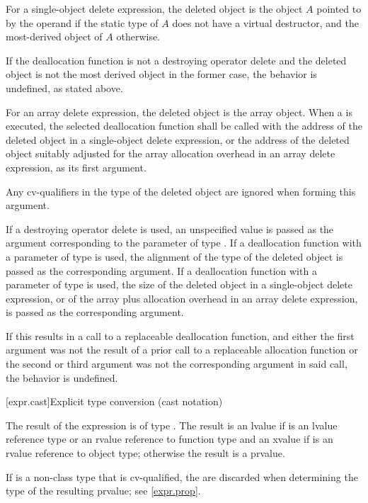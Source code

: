 \pnum
For a single-object delete expression,
the deleted object is
the object $A$ pointed to by the operand
if the static type of $A$ does not have a virtual destructor,
and the most-derived object of $A$ otherwise.
\begin{note}
If the deallocation function is not a destroying operator delete
and the deleted object is not the most derived object in the former case,
the behavior is undefined,
as stated above.
\end{note}
For an array delete expression,
the deleted object is
the array object.
When a 
is executed, the selected deallocation function shall be called with
the address of the deleted object
in a single-object delete expression, or
the address of the deleted object
suitably adjusted for the array allocation
overhead in an array delete expression,
as its first argument.
\begin{note}
Any cv-qualifiers in the type of the deleted object
are ignored when forming this argument.
\end{note}
If a destroying operator delete is used,
an unspecified value
is passed as the argument
corresponding to the parameter of type .
If a deallocation function
with a parameter of type 
is used,
the alignment of the type of the deleted object
is passed as the corresponding argument.
If a deallocation function
with a parameter of type  is used,
the size of the deleted object
in a single-object delete expression, or
of the array plus allocation overhead
in an array delete expression,
is passed as the corresponding argument.
\begin{note}
If this results in a call to a replaceable deallocation function,
and either
the first argument was not the result of
a prior call to a replaceable allocation function or
the second or third argument was not the corresponding argument in said call,
the behavior is undefined.
\end{note}

[expr.cast]{Explicit type conversion (cast notation)}%

\pnum
The result of the expression   is
of type . The result is an lvalue if  is an lvalue
reference type or an rvalue reference to function type and an xvalue if 
is an rvalue reference to object type; otherwise the result is a prvalue.
\begin{note}
If  is a non-class type that is cv-qualified, the
 are discarded when determining the type of the
resulting prvalue; see \ref{expr.prop}.
\end{note}

